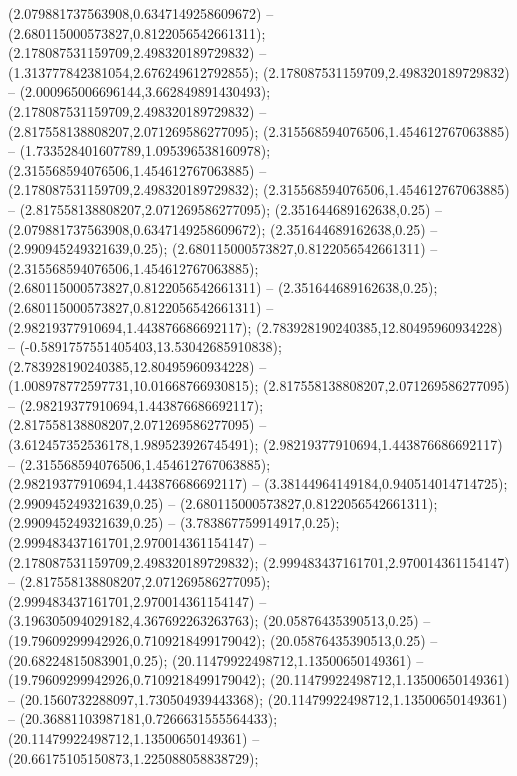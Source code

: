  (2.079881737563908,0.6347149258609672) -- (2.680115000573827,0.8122056542661311);
 (2.178087531159709,2.498320189729832) -- (1.313777842381054,2.676249612792855);
 (2.178087531159709,2.498320189729832) -- (2.000965006696144,3.662849891430493);
 (2.178087531159709,2.498320189729832) -- (2.817558138808207,2.071269586277095);
 (2.315568594076506,1.454612767063885) -- (1.733528401607789,1.095396538160978);
 (2.315568594076506,1.454612767063885) -- (2.178087531159709,2.498320189729832);
 (2.315568594076506,1.454612767063885) -- (2.817558138808207,2.071269586277095);
 (2.351644689162638,0.25) -- (2.079881737563908,0.6347149258609672);
 (2.351644689162638,0.25) -- (2.990945249321639,0.25);
 (2.680115000573827,0.8122056542661311) -- (2.315568594076506,1.454612767063885);
 (2.680115000573827,0.8122056542661311) -- (2.351644689162638,0.25);
 (2.680115000573827,0.8122056542661311) -- (2.98219377910694,1.443876686692117);
 (2.783928190240385,12.80495960934228) -- (-0.5891757551405403,13.53042685910838);
 (2.783928190240385,12.80495960934228) -- (1.008978772597731,10.01668766930815);
 (2.817558138808207,2.071269586277095) -- (2.98219377910694,1.443876686692117);
 (2.817558138808207,2.071269586277095) -- (3.612457352536178,1.989523926745491);
 (2.98219377910694,1.443876686692117) -- (2.315568594076506,1.454612767063885);
 (2.98219377910694,1.443876686692117) -- (3.38144964149184,0.940514014714725);
 (2.990945249321639,0.25) -- (2.680115000573827,0.8122056542661311);
 (2.990945249321639,0.25) -- (3.783867759914917,0.25);
 (2.999483437161701,2.970014361154147) -- (2.178087531159709,2.498320189729832);
 (2.999483437161701,2.970014361154147) -- (2.817558138808207,2.071269586277095);
 (2.999483437161701,2.970014361154147) -- (3.196305094029182,4.367692263263763);
 (20.05876435390513,0.25) -- (19.79609299942926,0.7109218499179042);
 (20.05876435390513,0.25) -- (20.68224815083901,0.25);
 (20.11479922498712,1.13500650149361) -- (19.79609299942926,0.7109218499179042);
 (20.11479922498712,1.13500650149361) -- (20.1560732288097,1.730504939443368);
 (20.11479922498712,1.13500650149361) -- (20.36881103987181,0.7266631555564433);
 (20.11479922498712,1.13500650149361) -- (20.66175105150873,1.225088058838729);
